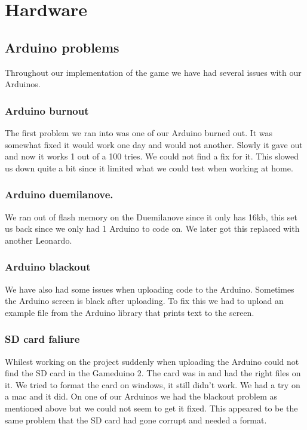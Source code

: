 \section{Hardware}

\subsection*{Arduino problems}
Throughout our implementation of the game we have had several issues with our Arduinos.

\subsubsection*{Arduino burnout}
The first problem we ran into was one of our Arduino burned out. It was somewhat fixed it would work one day and would not another. Slowly it gave out and now it works 1 out of a 100 tries. We could not find a fix for it. This slowed us down quite a bit since it limited what we could test when working at home.

\subsubsection*{Arduino duemilanove.}
We ran out of flash memory on the Duemilanove since it only has 16kb, this set us back since we only had 1 Arduino to code on. We later got this replaced with another Leonardo.

\subsubsection*{Arduino blackout}
We have also had some issues when uploading code to the Arduino. Sometimes the Arduino screen is black after uploading. To fix this we had to upload an example file from the Arduino library that prints text to the screen.

\subsubsection*{SD card faliure}
Whilest working on the project suddenly when uploading the Arduino could not find the SD card in the Gameduino 2. The card was in and had the right files on it. We tried to format the card on windows, it still didn't work. We had a try on a mac and it did. On one of our Arduinos we had the blackout problem as mentioned above but we could not seem to get it fixed. This appeared to be the same problem that the SD card had gone corrupt and needed a format.
